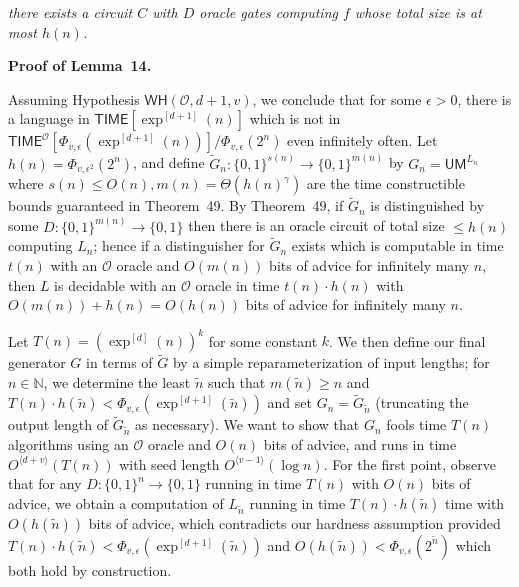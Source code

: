 \documentclass[10pt,a4paper]{article}
\begin{document}
\emph{there exists a circuit $C$ with $D$ oracle gates computing $f$ whose total size is at most $h(n)$.}\par






\par\medskip\noindent\textbf{Proof of Lemma 14.}\par




Assuming Hypothesis $\mathsf{WH}(\mathcal{O},d+1,v)$, we conclude that for some $\epsilon>0$, there is a language in ${\mathsf{TIME}}[\exp^{[d+1]}(n)]$ which is not in ${\mathsf{TIME}}^{\mathcal{O}}[\Phi_{v,\epsilon}(\exp^{[d+1]}(n))]/\Phi_{v,\epsilon}(2^{n})$ even infinitely often. Let $h(n)=\Phi_{v,\epsilon^{2}}(2^{n})$, and define $\tilde{G}_{n}:\{0,1\}^{s(n)}\to\{0,1\}^{m(n)}$ by $G_{n}=\mathsf{UM}^{L_{n}}$ where $s(n)\leq O(n),m(n)=\Theta(h(n)^{\gamma})$ are the time constructible bounds guaranteed in Theorem 49. By Theorem 49, if $\tilde{G}_{n}$ is distinguished by some $D:\{0,1\}^{m(n)}\to\{0,1\}$ then there is an oracle circuit of total size $\leq h(n)$ computing $L_{n}$; hence if a distinguisher for $\tilde{G}_{n}$ exists which is computable in time $t(n)$ with an $\mathcal{O}$ oracle and $O(m(n))$ bits of advice for infinitely many $n$, then $L$ is decidable with an $\mathcal{O}$ oracle in time $t(n)\cdot h(n)$ with $O(m(n))+h(n)=O(h(n))$ bits of advice for infinitely many $n$.\par




Let $T(n)=(\exp^{[d]}(n))^{k}$ for some constant $k$. We then define our final generator $G$ in terms of $\tilde{G}$ by a simple reparameterization of input lengths; for $n\in\mathbb{N}$, we determine the least $\tilde{n}$ such that $m(\tilde{n})\geq n$ and $T(n)\cdot h(\tilde{n})<\Phi_{v,\epsilon}(\exp^{[d+1]}(\tilde{n}))$
and set $G_{n}=\tilde{G}_{\tilde{n}}$ (truncating the output length of $\tilde{G}_{\tilde{n}}$ as necessary).
We want to show that $G_{n}$ fools time $T(n)$ algorithms using an $\mathcal{O}$ oracle and $O(n)$ bits of advice, and runs in time $O^{\langle d+v\rangle}(T(n))$ with seed length $O^{\langle v-1\rangle}(\log n)$. For the first point, observe that for any $D:\{0,1\}^{n}\to\{0,1\}$ running in time $T(n)$ with $O(n)$ bits of advice, we obtain a computation of $L_{\tilde{n}}$ running in time $T(n)\cdot h(\tilde{n})$ time with $O(h(\tilde{n}))$ bits of advice, which contradicts our hardness assumption provided $T(n)\cdot h(\tilde{n})<\Phi_{v,\epsilon}(\exp^{[d+1]}(\tilde{n}))$ and $O(h(\tilde{n}))<\Phi_{v,\epsilon}(2^{\tilde{n}})$ which both hold by construction.\par
\end{document}

